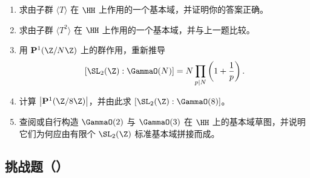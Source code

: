 \begin{enumerate}
  \item[\medium 46.] 求由子群 $\langle T\rangle$ 在 $\HH$ 上作用的一个基本域，并证明你的答案正确。
  \item[\medium 47.] 求由子群 $\langle T^2\rangle$ 在 $\HH$ 上作用的一个基本域，并与上一题比较。
  \item[\medium 48.] 用 $\mathbf{P}^1(\Z/N\Z)$ 上的群作用，重新推导
  \[
  [\SL_2(\Z):\GammaO(N)]
  =N\prod_{p\mid N}\left(1+\frac1p\right).
  \]
  \item[\medium 49.] 计算 $\bigl|\mathbf{P}^1(\Z/8\Z)\bigr|$，并由此求 $[\SL_2(\Z):\GammaO(8)]$。
  \item[\medium 50.] 查阅或自行构造 $\GammaO(2)$ 与 $\GammaO(3)$ 在 $\HH$ 上的基本域草图，并说明它们为何应由有限个 $\SL_2(\Z)$ 标准基本域拼接而成。
\end{enumerate}

\subsection*{挑战题（\hard）}

